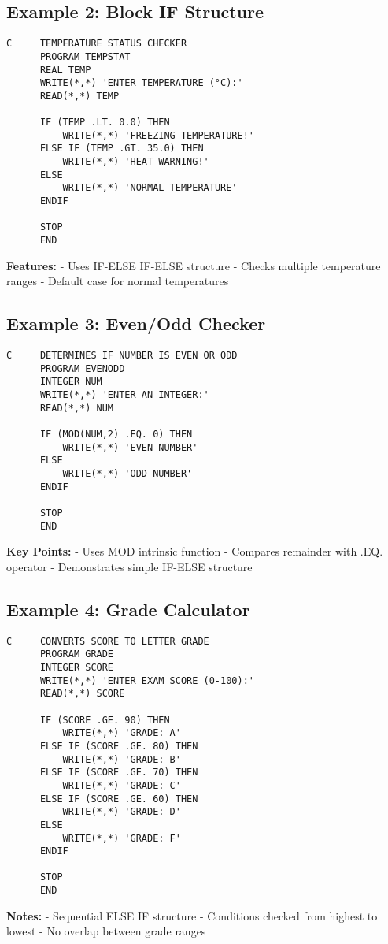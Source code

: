 \documentclass{book}
\begin{document}
\subsection*{Example 2: Block IF Structure}
\begin{verbatim}
C     TEMPERATURE STATUS CHECKER
      PROGRAM TEMPSTAT
      REAL TEMP
      WRITE(*,*) 'ENTER TEMPERATURE (°C):'
      READ(*,*) TEMP
      
      IF (TEMP .LT. 0.0) THEN
          WRITE(*,*) 'FREEZING TEMPERATURE!'
      ELSE IF (TEMP .GT. 35.0) THEN
          WRITE(*,*) 'HEAT WARNING!'
      ELSE
          WRITE(*,*) 'NORMAL TEMPERATURE'
      ENDIF
      
      STOP
      END
\end{verbatim}
\textbf{Features:}
- Uses IF-ELSE IF-ELSE structure
- Checks multiple temperature ranges
- Default case for normal temperatures

\subsection*{Example 3: Even/Odd Checker}
\begin{verbatim}
C     DETERMINES IF NUMBER IS EVEN OR ODD
      PROGRAM EVENODD
      INTEGER NUM
      WRITE(*,*) 'ENTER AN INTEGER:'
      READ(*,*) NUM
      
      IF (MOD(NUM,2) .EQ. 0) THEN
          WRITE(*,*) 'EVEN NUMBER'
      ELSE
          WRITE(*,*) 'ODD NUMBER'
      ENDIF
      
      STOP
      END
\end{verbatim}
\textbf{Key Points:}
- Uses MOD intrinsic function
- Compares remainder with .EQ. operator
- Demonstrates simple IF-ELSE structure

\subsection*{Example 4: Grade Calculator}
\begin{verbatim}
C     CONVERTS SCORE TO LETTER GRADE
      PROGRAM GRADE
      INTEGER SCORE
      WRITE(*,*) 'ENTER EXAM SCORE (0-100):'
      READ(*,*) SCORE
      
      IF (SCORE .GE. 90) THEN
          WRITE(*,*) 'GRADE: A'
      ELSE IF (SCORE .GE. 80) THEN
          WRITE(*,*) 'GRADE: B'
      ELSE IF (SCORE .GE. 70) THEN
          WRITE(*,*) 'GRADE: C'
      ELSE IF (SCORE .GE. 60) THEN
          WRITE(*,*) 'GRADE: D'
      ELSE
          WRITE(*,*) 'GRADE: F'
      ENDIF
      
      STOP
      END
\end{verbatim}
\textbf{Notes:}
- Sequential ELSE IF structure
- Conditions checked from highest to lowest
- No overlap between grade ranges
\end{document}
